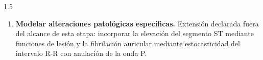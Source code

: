 \begin{spacing}{1.5}
\begin{enumerate}
    \item \textbf{Modelar alteraciones patológicas específicas.} Extensión declarada fuera del alcance de esta etapa: incorporar la elevación del segmento ST mediante funciones de lesión y la fibrilación auricular mediante estocasticidad del intervalo R-R con anulación de la onda P.
\end{enumerate}

\end{spacing}
